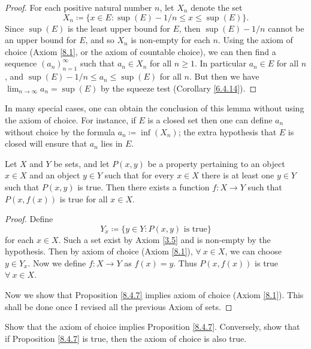 \begin{proof}
For each positive natural number \(n\), let \(X_n\) denote the set
\[
    X_n \coloneqq \{x \in E : \sup(E) - 1 / n \leq x \leq \sup(E)\}.
\]
Since \(\sup(E)\) is the least upper bound for \(E\), then \(\sup(E) - 1 / n\) cannot be an upper bound for \(E\), and so \(X_n\) is non-empty for each \(n\).
Using the axiom of choice (Axiom \ref{8.1}, or the axiom of countable choice), we can then find a sequence \((a_n)_{n = 1}^\infty\) such that \(a_n \in X_n\) for all \(n \geq 1\).
In particular \(a_n \in E\) for all \(n\), and \(\sup(E) - 1 / n \leq a_n \leq \sup(E)\) for all \(n\).
But then we have \(\lim_{n \to \infty} a_n = \sup(E)\) by the squeeze test (Corollary \ref{6.4.14}).
\end{proof}

\begin{remark}\label{8.4.6}
In many special cases, one can obtain the conclusion of this lemma without using the axiom of choice.
For instance, if \(E\) is a closed set then one can define \(a_n\) without choice by the formula \(a_n \coloneqq \inf(X_n)\);
the extra hypothesis that \(E\) is closed will ensure that \(a_n\) lies in \(E\).
\end{remark}

\begin{proposition}\label{8.4.7}
Let \(X\) and \(Y\) be sets, and let \(P(x, y)\) be a property pertaining to an object \(x \in X\) and an object \(y \in Y\) such that for every \(x \in X\) there is at least one \(y \in Y\) such that \(P(x, y)\) is true.
Then there exists a function \(f : X \to Y\) such that \(P(x, f(x))\) is true for all \(x \in X\).
\end{proposition}

\begin{proof}
Define
\[
    Y_x \coloneqq \{y \in Y : P(x, y) \text{ is true}\}
\]
for each \(x \in X\).
Such a set exist by Axiom \ref{3.5} and is non-empty by the hypothesis.
Then by axiom of choice (Axiom \ref{8.1}), \(\forall\ x \in X\), we can choose \(y \in Y_x\).
Now we define \(f : X \to Y\) as \(f(x) = y\).
Thus \(P(x, f(x))\) is true \(\forall\ x \in X\).

Now we show that Proposition \ref{8.4.7} implies axiom of choice (Axiom \ref{8.1}).
This shall be done once I revised all the previous Axiom of sets.
\end{proof}

\exercisesection

\begin{exercise}\label{ex 8.4.1}
Show that the axiom of choice implies Proposition \ref{8.4.7}.
Conversely, show that if Proposition \ref{8.4.7} is true, then the axiom of choice is also true.
\end{exercise}